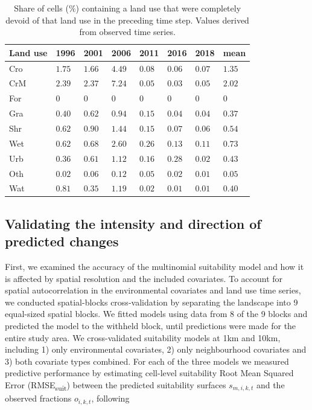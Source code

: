 \documentclass[titlesmallcaps,copyrightpage]{uomthesis}\usepackage[]{graphicx}\usepackage[]{color}
\begin{document}
\begin{table}[htb]
\captionsetup{width=.5\textwidth}
\caption{Share of cells ($\%$) containing a land use that were completely devoid of that land use in the preceding time step. Values derived from observed time series.}  
\label{ch3:tab4}
\footnotesize
\centering
\begin{tabularx}{.5\textwidth}{@{}lXXXXXXX@{}}
\toprule 
Land use & 1996 & 2001 & 2006 & 2011 & 2016 & 2018 & mean \\ 
\toprule 
Cro & $1.75$ & $1.66$ & $4.49$ & $0.08$ & $0.06$ & $0.07$ & $1.35$ \\ 
CrM & $2.39$ & $2.37$ & $7.24$ & $0.05$ & $0.03$ & $0.05$ & $2.02$ \\ 
For & $0$ & $0$ & $0$ & $0$ & $0$ & $0$ & $0$ \\ 
Gra & $0.40$ & $0.62$ & $0.94$ & $0.15$ & $0.04$ & $0.04$ & $0.37$ \\ 
Shr & $0.62$ & $0.90$ & $1.44$ & $0.15$ & $0.07$ & $0.06$ & $0.54$ \\ 
Wet & $0.62$ & $0.68$ & $2.60$ & $0.26$ & $0.13$ & $0.11$ & $0.73$ \\ 
Urb & $0.36$ & $0.61$ & $1.12$ & $0.16$ & $0.28$ & $0.02$ & $0.43$ \\ 
Oth & $0.02$ & $0.06$ & $0.12$ & $0.05$ & $0.02$ & $0.01$ & $0.05$ \\ 
Wat & $0.81$ & $0.35$ & $1.19$ & $0.02$ & $0.01$ & $0.01$ & $0.40$ \\ 
\bottomrule 
\end{tabularx} 
\end{table}

\subsection{Validating the intensity and direction of predicted
changes}

First, we examined the accuracy of the multinomial suitability model and
how it is affected by spatial resolution and the included covariates. To
account for spatial autocorrelation in the environmental covariates and
land use time series, we conducted spatial-blocks cross-validation
\citep{valavi_blockcv:_2019} by separating the landscape into 9
equal-sized spatial blocks. We fitted models using data from 8 of the 9
blocks and predicted the model to the withheld block, until predictions
were made for the entire study area. We cross-validated suitability
models at 1km and 10km, including 1) only environmental covariates, 2)
only neighbourhood covariates and 3) both covariate types combined. For
each of the three models we measured predictive performance by
estimating cell-level suitability Root Mean Squared Error
(RMSE\textsubscript{suit}) between the predicted suitability surfaces
\(s_{m,i,k,t}\) and the observed fractions \(o_{i,k,t}\), following
\end{document}
